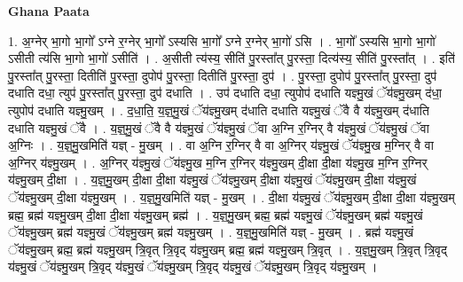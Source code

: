 \documentclass[17pt]{extarticle}
\begin{document}
\textbf{Ghana Paata } \newline

1. अ॒ग्नेर् भा॒गो भा॒गो᳚ ऽग्ने र॒ग्नेर् भा॒गो᳚ ऽस्यसि भा॒गो᳚ ऽग्ने र॒ग्नेर् भा॒गो॑ ऽसि । . भा॒गो᳚ ऽस्यसि भा॒गो भा॒गो॑ ऽसीती त्य॑सि भा॒गो भा॒गो॑ ऽसीति॑ । . अ॒सीती त्य॑स्य॒ सीति॑ पु॒रस्ता᳚त् पु॒रस्ता॒ दित्य॑स्य॒ सीति॑ पु॒रस्ता᳚त् । . इति॑ पु॒रस्ता᳚त् पु॒रस्ता॒ दितीति॑ पु॒रस्ता॒ दुपोप॑ पु॒रस्ता॒ दितीति॑ पु॒रस्ता॒ दुप॑ । . पु॒रस्ता॒ दुपोप॑ पु॒रस्ता᳚त् पु॒रस्ता॒ दुप॑ दधाति दधा॒ त्युप॑ पु॒रस्ता᳚त् पु॒रस्ता॒ दुप॑ दधाति । . उप॑ दधाति दधा॒ त्युपोप॑ दधाति यज्ञ्मु॒खं ॅय॑ज्ञ्मु॒खम् द॑धा॒ त्युपोप॑ दधाति यज्ञ्मु॒खम् । . द॒धा॒ति॒ य॒ज्ञ्॒मु॒खं ॅय॑ज्ञ्मु॒खम् द॑धाति दधाति यज्ञ्मु॒खं ॅवै वै य॑ज्ञ्मु॒खम् द॑धाति दधाति यज्ञ्मु॒खं ॅवै । . य॒ज्ञ्॒मु॒खं ॅवै वै य॑ज्ञ्मु॒खं ॅय॑ज्ञ्मु॒खं ॅवा अ॒ग्नि र॒ग्निर् वै य॑ज्ञ्मु॒खं ॅय॑ज्ञ्मु॒खं ॅवा अ॒ग्निः । . य॒ज्ञ्॒मु॒खमिति॑ यज्ञ् - मु॒खम् । . वा अ॒ग्नि र॒ग्निर् वै वा अ॒ग्निर् य॑ज्ञ्मु॒खं ॅय॑ज्ञ्मु॒ख म॒ग्निर् वै वा अ॒ग्निर् य॑ज्ञ्मु॒खम् । . अ॒ग्निर् य॑ज्ञ्मु॒खं ॅय॑ज्ञ्मु॒ख म॒ग्नि र॒ग्निर् य॑ज्ञ्मु॒खम् दी॒क्षा दी॒क्षा य॑ज्ञ्मु॒ख म॒ग्नि र॒ग्निर् य॑ज्ञ्मु॒खम् दी॒क्षा । . य॒ज्ञ्॒मु॒खम् दी॒क्षा दी॒क्षा य॑ज्ञ्मु॒खं ॅय॑ज्ञ्मु॒खम् दी॒क्षा य॑ज्ञ्मु॒खं ॅय॑ज्ञ्मु॒खम् दी॒क्षा य॑ज्ञ्मु॒खं ॅय॑ज्ञ्मु॒खम् दी॒क्षा य॑ज्ञ्मु॒खम् । . य॒ज्ञ्॒मु॒खमिति॑ यज्ञ् - मु॒खम् । . दी॒क्षा य॑ज्ञ्मु॒खं ॅय॑ज्ञ्मु॒खम् दी॒क्षा दी॒क्षा य॑ज्ञ्मु॒खम् ब्रह्म॒ ब्रह्म॑ यज्ञ्मु॒खम् दी॒क्षा दी॒क्षा य॑ज्ञ्मु॒खम् ब्रह्म॑ । . य॒ज्ञ्॒मु॒खम् ब्रह्म॒ ब्रह्म॑ यज्ञ्मु॒खं ॅय॑ज्ञ्मु॒खम् ब्रह्म॑ यज्ञ्मु॒खं ॅय॑ज्ञ्मु॒खम् ब्रह्म॑ यज्ञ्मु॒खं ॅय॑ज्ञ्मु॒खम् ब्रह्म॑ यज्ञ्मु॒खम् । . य॒ज्ञ्॒मु॒खमिति॑ यज्ञ् - मु॒खम् । . ब्रह्म॑ यज्ञ्मु॒खं ॅय॑ज्ञ्मु॒खम् ब्रह्म॒ ब्रह्म॑ यज्ञ्मु॒खम् त्रि॒वृत् त्रि॒वृद् य॑ज्ञ्मु॒खम् ब्रह्म॒ ब्रह्म॑ यज्ञ्मु॒खम् त्रि॒वृत् । . य॒ज्ञ्॒मु॒खम् त्रि॒वृत् त्रि॒वृद् य॑ज्ञ्मु॒खं ॅय॑ज्ञ्मु॒खम् त्रि॒वृद् य॑ज्ञ्मु॒खं ॅय॑ज्ञ्मु॒खम् त्रि॒वृद् य॑ज्ञ्मु॒खं ॅय॑ज्ञ्मु॒खम् त्रि॒वृद् य॑ज्ञ्मु॒खम् । \newline
\end{document}

